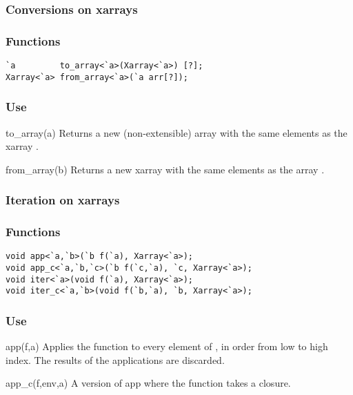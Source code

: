 \subsubsection*{Conversions on xarrays}
\subsubsection*{Functions}
\begin{verbatim}
`a         to_array<`a>(Xarray<`a>) [?];
Xarray<`a> from_array<`a>(`a arr[?]);
\end{verbatim}

\subsubsection*{Use}

\begin{defun}{to_array}{(a)}
Returns a new (non-extensible) array with the same elements as the
xarray .
\end{defun}

\begin{defun}{from_array}{(b)}
Returns a new xarray with the same elements as the array .
\end{defun}

\subsubsection*{Iteration on xarrays}
\subsubsection*{Functions}
\begin{verbatim}
void app<`a,`b>(`b f(`a), Xarray<`a>);
void app_c<`a,`b,`c>(`b f(`c,`a), `c, Xarray<`a>);
void iter<`a>(void f(`a), Xarray<`a>);
void iter_c<`a,`b>(void f(`b,`a), `b, Xarray<`a>);
\end{verbatim}

\subsubsection*{Use}

\begin{defun}{app}{(f,a)}
Applies the function  to every element of , in order from
low to high index.  The results of the applications are discarded.
\end{defun}

\begin{defun}{app_c}{(f,env,a)}
A version of app where the function  takes a closure.
\end{defun}

